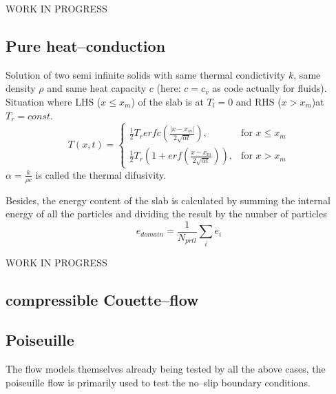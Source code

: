 \documentclass{report}
\begin{document}
WORK IN PROGRESS 

\subsection{Pure heat--conduction}
 
Solution of two semi infinite solids with same thermal condictivity $k$, same density $\rho$ and same heat capacity $c$ (here: $c=c_v$ as code actually for fluids). Situation where LHS ($x \leq x_m$) of the slab is at $T_l=0$ and RHS ($x > x_m$)at $T_r=const.$ \cite{Carslaw1959}
\begin{equation}
 T(x,t)=\begin{cases}
\frac{1}{2} T_r erfc\left(\frac{|x-x_m|}{2\sqrt{\alpha t}}\right),& \text{for  $x\leq x_m$} \\
\frac{1}{2} T_r\left(1+erf\left(\frac{x-x_m}{2\sqrt{\alpha t}}\right)\right),& \text{for  $x> x_m$}
\end{cases}
\end{equation}
$\alpha=\frac{k}{\rho c}$ is called the thermal difusivity. 

Besides, the energy content of the slab is calculated by summing the internal energy of all the particles and dividing the result by the number of particles
\begin{equation}
 \label{eq:energyContent}
e_{\mathit{domain}}=\frac{1}{N_{\mathit{prtl}}}\sum_i e_i
\end{equation}


WORK IN PROGRESS 

\subsection{compressible Couette--flow}

\subsection{Poiseuille}
\label{sec:genIntroPoiseuille}
 The flow models themselves already being tested by all the above cases, the poiseuille flow is primarily used to test the no--slip boundary conditions. 
\end{document}
